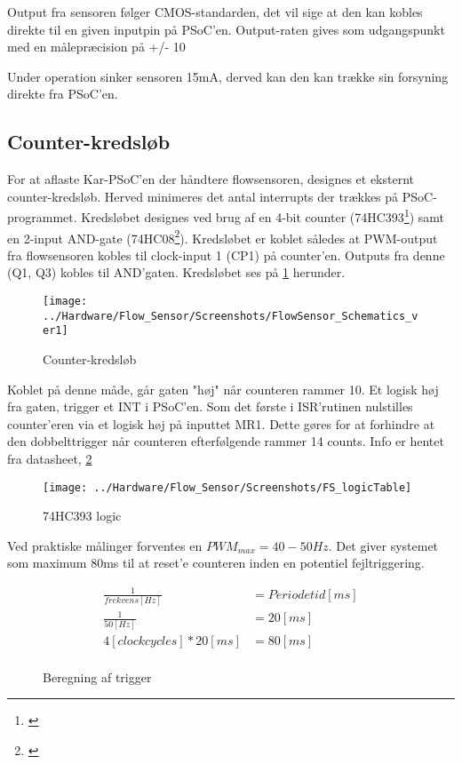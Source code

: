 Output fra sensoren følger CMOS-standarden, det vil sige at den kan kobles direkte til en given inputpin på PSoC'en. Output-raten gives som udgangspunkt med en målepræcision på +/- 10%
 
Under operation sinker sensoren 15mA, derved kan den kan trække sin forsyning direkte fra PSoC'en.

\subsection{Counter-kredsløb}
For at aflaste Kar-PSoC'en der håndtere flowsensoren, designes et eksternt counter-kredsløb. Herved minimeres det antal interrupts der trækkes på PSoC-programmet. Kredsløbet designes ved brug af en 4-bit counter (74HC393\footnote{\citet{nxp:74HC393}}) samt en 2-input AND-gate (74HC08\footnote{\citet{nxp:74HC08}}). 
Kredsløbet er koblet således at PWM-output fra flowsensoren kobles til clock-input 1 (CP1) på counter'en. Outputs fra denne (Q1, Q3) kobles til AND'gaten.
Kredsløbet ses på \ref{screenshot:counter} herunder. 

\begin{figure}[H]
	\centering
	\texttt{[image: ../Hardware/Flow\_Sensor/Screenshots/FlowSensor\_Schematics\_ver1]}
	\caption{Counter-kredsløb}
	\label{screenshot:counter}
\end{figure}

Koblet på denne måde, går gaten "høj" når counteren rammer 10. Et logisk høj fra gaten, trigger et INT i PSoC'en. Som det første i ISR'rutinen nulstilles counter'eren via et logisk høj på inputtet MR1. Dette gøres for at forhindre at den dobbelttrigger når counteren efterfølgende rammer 14 counts. Info er hentet fra datasheet, \ref{screenshot:logicTable}

\begin{figure}[H]
	\centering
	\texttt{[image: ../Hardware/Flow\_Sensor/Screenshots/FS\_logicTable]}
	\caption{74HC393 logic}
	\label{screenshot:logicTable}
\end{figure}

Ved praktiske målinger forventes en $PWM_{max}=40-50Hz$.
Det giver systemet som maximum 80ms til at reset'e counteren inden en potentiel fejltriggering.

\begin{figure}[H]
    \begin{align*}
       \frac{1}{frekvens[Hz]} &= Periodetid[ms] \\
       \frac{1}{50[Hz]} &= 20[ms] \\
       4[clockcycles]*20[ms] &= 80[ms] \\ 
    \end{align*}
\label{eq:Trigger}
\caption{Beregning af trigger}
\end{figure}

